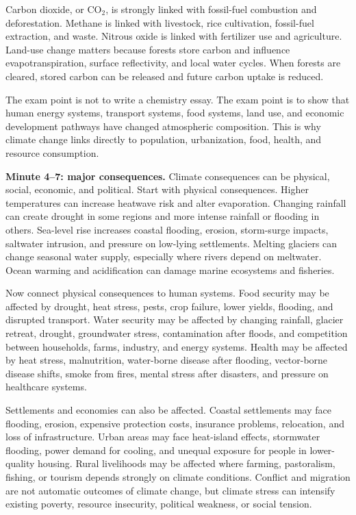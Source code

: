 \documentclass[11pt,a4paper]{article}
\begin{document}
Carbon dioxide, or CO$_2$, is strongly linked with fossil-fuel combustion and
deforestation. Methane is linked with livestock, rice cultivation, fossil-fuel
extraction, and waste. Nitrous oxide is linked with fertilizer use and
agriculture. Land-use change matters because forests store carbon and influence
evapotranspiration, surface reflectivity, and local water cycles. When forests
are cleared, stored carbon can be released and future carbon uptake is reduced.

The exam point is not to write a chemistry essay. The exam point is to show
that human energy systems, transport systems, food systems, land use, and
economic development pathways have changed atmospheric composition. This is why
climate change links directly to population, urbanization, food, health, and
resource consumption.

\textbf{Minute 4--7: major consequences.}
Climate consequences can be physical, social, economic, and political. Start
with physical consequences. Higher temperatures can increase heatwave risk and
alter evaporation. Changing rainfall can create drought in some regions and
more intense rainfall or flooding in others. Sea-level rise increases coastal
flooding, erosion, storm-surge impacts, saltwater intrusion, and pressure on
low-lying settlements. Melting glaciers can change seasonal water supply,
especially where rivers depend on meltwater. Ocean warming and acidification
can damage marine ecosystems and fisheries.

Now connect physical consequences to human systems. Food security may be
affected by drought, heat stress, pests, crop failure, lower yields, flooding,
and disrupted transport. Water security may be affected by changing rainfall,
glacier retreat, drought, groundwater stress, contamination after floods, and
competition between households, farms, industry, and energy systems. Health may
be affected by heat stress, malnutrition, water-borne disease after flooding,
vector-borne disease shifts, smoke from fires, mental stress after disasters,
and pressure on healthcare systems.

Settlements and economies can also be affected. Coastal settlements may face
flooding, erosion, expensive protection costs, insurance problems, relocation,
and loss of infrastructure. Urban areas may face heat-island effects, stormwater
flooding, power demand for cooling, and unequal exposure for people in
lower-quality housing. Rural livelihoods may be affected where farming,
pastoralism, fishing, or tourism depends strongly on climate conditions.
Conflict and migration are not automatic outcomes of climate change, but climate
stress can intensify existing poverty, resource insecurity, political weakness,
or social tension.
\end{document}
